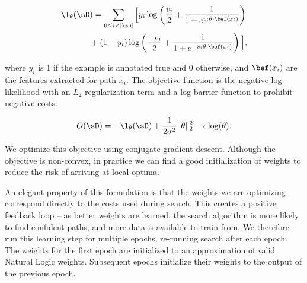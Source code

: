 \vspace{-0.75em}
\begin{align*}
\l_\theta(\sD&) = \sum_{0 \leq i < |\sD|} \Big[
    y_i \log \left(\frac{v_i}{2} + \frac{1}{1 + e^{v_i \theta \cdot \bef(x_i)}} \right) \\
    &+ (1 - y_i) \log \left(\frac{-v_i}{2} + \frac{1}{1 + e^{-v_i \theta \cdot \bef(x_i)}} \right)
  \Big],
\end{align*}
\vspace{-1.0em}

\noindent where $y_i$ is 1 if the example is annotated true and 0
  otherwise, and $\bef(x_i)$ are the features extracted for path $x_i$.
The objective function is the negative log likelihood with
  an $L_2$ regularization term and a log barrier function to 
  prohibit negative costs:

\vspace{-1.0em}
\begin{equation*}
O(\sD) = -\l_\theta(\sD) 
  + \frac{1}{2 \sigma^2}\|\theta\|_2^2
  - \epsilon \log(\theta).
\end{equation*}
\vspace{-1.0em}

We optimize this objective using conjugate gradient descent.
Although the objective is non-convex, in practice we can find a good
  initialization of weights to reduce the risk of arriving at
  local optima.

An elegant property of this formulation is that the weights we are
  optimizing correspond directly to the costs used during search.
This creates a positive feedback loop -- as better weights are learned,
  the search algorithm is more likely to find confident paths, and
  more data is available to train from.
We therefore run this learning step for multiple epochs,
  re-running search after each epoch.
The weights for the first epoch are initialized to an approximation
  of valid Natural Logic weights.
Subsequent epochs initialize their weights to the output of the previous
  epoch.






